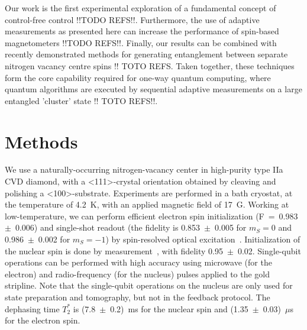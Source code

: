 Our work is the first experimental exploration of a fundamental concept of control-free control !!TODO REFS!!. Furthermore, the use of adaptive measurements as presented here can increase the performance of spin-based magnetometers !!TODO REFS!!. Finally, our results can be combined with recently demonstrated methods for generating entanglement between separate nitrogen vacancy centre spins !! TOTO REFS. Taken together, these techniques form the core capability required for one-way quantum computing, where quantum algorithms are executed by sequential adaptive measurements on a large entangled 'cluster' state !! TOTO REFS!!.


\section{Methods}
We use a naturally-occurring nitrogen-vacancy center in high-purity type IIa CVD diamond, with a \textless 111\textgreater-crystal orientation obtained by cleaving and polishing a \textless100\textgreater -substrate. Experiments are performed in a bath cryostat, at the temperature of 4.2~K, with an applied magnetic field of 17~G. Working at low-temperature, we can perform efficient electron spin initialization (F~=~0.983~$\pm$~0.006) and single-shot readout (the fidelity is 0.853~$\pm$~0.005 for $m_S = 0$ and 0.986~$\pm$~0.002 for $m_S = -1$) by spin-resolved optical excitation~\cite{Robledo_Nature_2011}. Initialization of the nuclear spin is done by measurement~\cite{Robledo_Nature_2011}, with fidelity  0.95~$\pm$~0.02. Single-qubit operations can be performed with high accuracy using microwave (for the electron) and radio-frequency (for the nucleus) pulses applied to the gold stripline. Note that the single-qubit operations on the nucleus are only used for state preparation and tomography, but not in the feedback protocol. The dephasing time $T_2^*$ is (7.8~$\pm$~0.2)~ms for the nuclear spin and (1.35~$\pm$~0.03)~$\mu$s for the electron spin. 


